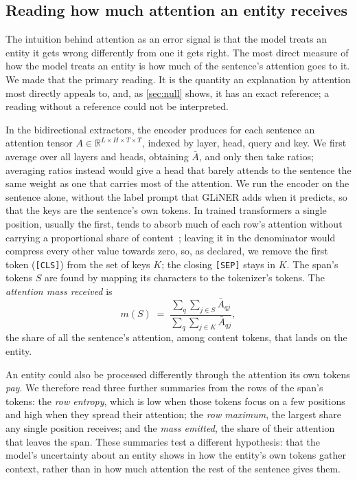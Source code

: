\documentclass[11pt,a4paper]{article}
\newcommand{\gliner}{GLiNER}
\begin{document}
\subsection{Reading how much attention an entity receives}
\label{sec:reading}

The intuition behind attention as an error signal is that the model treats an
entity it gets wrong differently from one it gets right. The most direct measure of how the model treats an entity is
how much of the sentence's attention goes to it. We made that the primary reading. It is the quantity an explanation by attention most directly appeals to, and, as \cref{sec:null}
shows, it has an exact reference; a reading without a reference could not be interpreted.

In the bidirectional extractors, the encoder produces for each sentence an attention tensor
$A\in\mathbb{R}^{L\times H\times T\times T}$, indexed by layer, head, query and key. We first average over all layers and
heads, obtaining $\bar A$, and only then take ratios; averaging ratios instead would give a head that barely attends to
the sentence the same weight as one that carries most of the attention. We run the encoder on the sentence alone, without the label prompt that \gliner{} adds when it predicts, so that the
keys are the sentence's own tokens. In trained transformers a single position, usually the first, tends to absorb much of
each row's attention without carrying a proportional share of content~\citep{clark2019bert,xiao2023sinks,papamichalis2026attentionrows};
leaving it in the denominator would compress every other value towards zero, so, as declared, we remove the first token
(\texttt{[CLS]}) from the set of keys $K$; the closing \texttt{[SEP]} stays in $K$. The
span's tokens $S$ are found by mapping its characters to the tokenizer's tokens. The \emph{attention mass received} is
\begin{equation}
  m(S) \;=\; \frac{\sum_{q}\sum_{j\in S}\bar A_{qj}}{\sum_{q}\sum_{j\in K}\bar A_{qj}},
  \label{eq:mass}
\end{equation}
the share of all the sentence's attention, among content tokens, that lands on the entity.

An entity could also be processed differently through the attention
its own tokens \emph{pay}. We therefore read three further summaries from the rows of the span's tokens: the \emph{row
entropy}, which is low when those tokens focus on a few positions and high when they spread their attention; the \emph{row
maximum}, the largest share any single position receives; and the \emph{mass emitted}, the share of their attention that
leaves the span. These summaries test a different hypothesis: that the model's uncertainty
about an entity shows in how the entity's own tokens gather context, rather than in how much attention the rest of the
sentence gives them.
\end{document}
